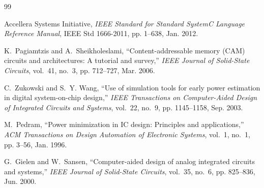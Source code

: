 \documentclass[11pt,a4paper,oneside]{report}
\begin{document}
\begin{thebibliography}{99}

Accellera Systems Initiative, \emph{IEEE Standard for Standard SystemC Language Reference Manual}, IEEE Std 1666-2011, pp. 1--638, Jan. 2012.

K.~Pagiamtzis and A.~Sheikholeslami, ``Content-addressable memory (CAM) circuits and architectures: A tutorial and survey,'' \emph{IEEE Journal of Solid-State Circuits}, vol.~41, no.~3, pp. 712--727, Mar. 2006.

C.~Zukowski and S.~Y. Wang, ``Use of simulation tools for early power estimation in digital system-on-chip design,'' \emph{IEEE Transactions on Computer-Aided Design of Integrated Circuits and Systems}, vol.~22, no.~9, pp. 1145--1158, Sep. 2003.

M.~Pedram, ``Power minimization in IC design: Principles and applications,'' \emph{ACM Transactions on Design Automation of Electronic Systems}, vol.~1, no.~1, pp. 3--56, Jan. 1996.

G.~Gielen and W.~Sansen, ``Computer-aided design of analog integrated circuits and systems,'' \emph{IEEE Journal of Solid-State Circuits}, vol.~35, no.~6, pp. 825--836, Jun. 2000.

\end{thebibliography}
\end{document}
